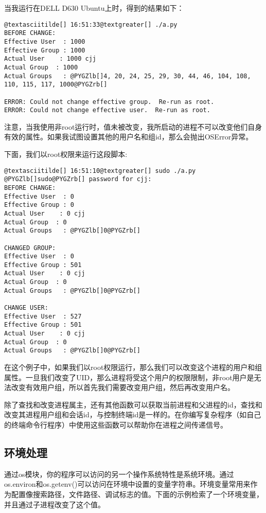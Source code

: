 \documentclass[a4paper,10pt,english]{manual}
\begin{document}
当我运行在DELL D630 Ubuntu上时，得到的结果如下：

\begin{Verbatim}[commandchars=@\[\]]
@textasciitilde[] 16:51:33@textgreater[] ./a.py
BEFORE CHANGE:
Effective User  : 1000
Effective Group : 1000
Actual User    : 1000 cjj
Actual Group  : 1000
Actual Groups   : @PYGZlb[]4, 20, 24, 25, 29, 30, 44, 46, 104, 108, 110, 115, 117, 1000@PYGZrb[]

ERROR: Could not change effective group.  Re-run as root.
ERROR: Could not change effective user.  Re-run as root.
\end{Verbatim}

注意，当我使用非root运行时，值未被改变，我所启动的进程不可以改变他们自身有效的属性。如果我试图设置其他的用户名和组id，那么会抛出OSError异常。

下面，我们以root权限来运行这段脚本:

\begin{Verbatim}[commandchars=@\[\]]
@textasciitilde[] 16:51:10@textgreater[] sudo ./a.py
@PYGZlb[]sudo@PYGZrb[] password for cjj:
BEFORE CHANGE:
Effective User  : 0
Effective Group : 0
Actual User    : 0 cjj
Actual Group  : 0
Actual Groups   : @PYGZlb[]0@PYGZrb[]

CHANGED GROUP:
Effective User  : 0
Effective Group : 501
Actual User    : 0 cjj
Actual Group  : 0
Actual Groups   : @PYGZlb[]0@PYGZrb[]

CHANGE USER:
Effective User  : 527
Effective Group : 501
Actual User    : 0 cjj
Actual Group  : 0
Actual Groups   : @PYGZlb[]0@PYGZrb[]
\end{Verbatim}

在这个例子中，如果我们以root权限运行，那么我们可以改变这个进程的用户和组属性。一旦我们改变了UID，那么进程将受这个用户的权限限制，非root用户是无法改变有效用户组，所以首先我们需要改变用户组，然后再改变用户名。

除了查找和改变进程属主，还有其他函数可以获取当前进程和父进程的id，查找和改变其进程用户组和会话id，与控制终端id是一样的。在你编写复杂程序（如自己的终端命令行程序）中使用这些函数可以帮助你在进程之间传递信号。


\subsection{环境处理}

通过os模块，你的程序可以访问的另一个操作系统特性是系统环境。通过os.environ和os.getenv()可以访问在环境中设置的变量字符串。环境变量常用来作为配置像搜索路径，文件路径、调试标志的值。下面的示例检索了一个环境变量，并且通过子进程改变了这个值。
\end{document}
